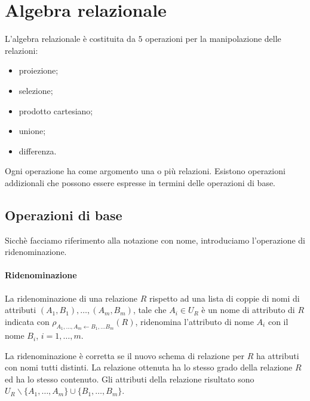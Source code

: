 \section{Algebra relazionale}%
\label{sec:Algebra relazionale}
L'algebra relazionale è costituita da $5$ operazioni per la manipolazione
delle relazioni:
\begin{itemize}
  \item proiezione;
  \item selezione;
  \item prodotto cartesiano;
  \item unione;
  \item differenza.
\end{itemize}

Ogni operazione ha come argomento una o più relazioni.
Esistono operazioni addizionali che possono essere espresse in termini delle
operazioni di base.

\subsection{Operazioni di base}%
\label{sub:Operazioni di base}
Sicchè facciamo riferimento alla notazione con nome, introduciamo l'operazione
di ridenominazione.

\paragraph{Ridenominazione}%
\label{par:Ridenominazione}
La ridenominazione di una relazione $R$ rispetto ad una lista di coppie di nomi
di attributi $(A_1,B_1),\dots,(A_m,B_m)$, tale che $A_i\in U_R$ è un nome di
attributo di $R$ indicata con $\rho_{A_1,\dots,A_m\leftarrow B_1,\dots B_m}(R)$,
ridenomina l'attributo di nome $A_i$ con il nome $B_i$, $i=1,\dots,m$.

La ridenominazione è corretta se il nuovo schema di relazione per $R$ ha
attributi con nomi tutti distinti.
La relazione ottenuta ha lo stesso grado della relazione $R$ ed ha lo stesso
contenuto.
Gli attributi della relazione risultato sono
$U_R\backslash\{A_1,\dots,A_m\}\cup\{B_1,\dots,B_m\}$.

